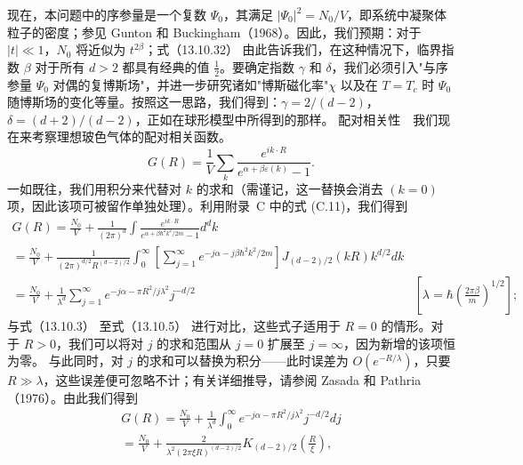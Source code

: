 现在，本问题中的序参量是一个复数 \(\Psi_{0}\)，其满足 \(|\Psi_{0}|^{2}=N_{0}/V\)，即系统中凝聚体粒子的密度；参见 Gunton 和 Buckingham（1968）。因此，我们预期：对于 \(|t|\ll1\)，\(N_{0}\) 将近似为 \(t^{2\beta}\)；式（13.10.32） 由此告诉我们，在这种情况下，临界指数 \(\beta\) 对于所有 \(d>2\) 都具有经典的值 \(\frac{1}{2}\)。要确定指数 \(\gamma\) 和 \(\delta\)，我们必须引入"与序参量 \(\Psi_{0}\) 对偶的复博斯场"，并进一步研究诸如"博斯磁化率"\(\chi\) 以及在 \(T=T_{c}\) 时 \(\Psi_{0}\) 随博斯场的变化等量。按照这一思路，我们得到：\(\gamma=2/(d-2)\)，\(\delta=(d+2)/(d-2)\)，正如在球形模型中所得到的那样。
配对相关性　我们现在来考察理想玻色气体的配对相关函数。
\begin{equation}\tag{13.6.41}\label{eq:13.6.41}
G ( R ) = \frac { 1 } { V } \sum _ { k } \frac { e ^{i k \cdot R} } { e ^{\alpha + \beta \varepsilon ( k )} - 1 } .
\end{equation}
一如既往，我们用积分来代替对 \(k\) 的求和（需谨记，这一替换会消去 \((k=0)\) 项，因此该项可被留作单独处理）。利用附录~C 中的式 (C.11)，我们得到
\begin{equation}\tag{13.6.42}\label{eq:13.6.42}
\begin{array}{rl} { G ( R ) = \frac { N _ { 0 } } { V } + \frac { 1 } { ( 2 \pi ) ^{d} } \int \frac { e ^{i k \cdot R} } { e ^{\alpha + \beta \hbar ^ { 2} k ^{2} / 2 m } - 1 } d ^{d} k } & { } \\{ = \frac { N _ { 0 } } { V } + \frac { 1 } { ( 2 \pi ) ^{d / 2} R ^{( d - 2 ) / 2} } \int _ { 0 } ^{\infty} \left[ \sum _ { j = 1 } ^{\infty} e ^{- j \alpha - j \beta \hbar ^ { 2} k ^{2} / 2 m } \right] J _ { ( d - 2 ) / 2 } ( k R ) k ^{d / 2} d k } & { } \\{ = \frac { N _ { 0 } } { V } + \frac { 1 } { \lambda ^{d} } \sum _ { j = 1 } ^{\infty} e ^{- j \alpha - \pi R ^ { 2} / j \lambda ^{2} } j ^{- d / 2} } & { \left[ \lambda = \hbar \left( \frac { 2 \pi \beta } { m } \right) ^{1 / 2} \right] ; } \end{array}
\end{equation}
与式（13.10.3） 至式（13.10.5） 进行对比，这些式子适用于 \(R=0\) 的情形。对于 \(R>0\)，我们可以将对 \(j\) 的求和范围从 \(j=0\) 扩展至 \(j=\infty\)，因为新增的该项恒为零。
与此同时，对 \(j\) 的求和可以替换为积分——此时误差为 \(O(e^{-R/\lambda})\)，只要 \(R \gg \lambda\)，这些误差便可忽略不计；有关详细推导，请参阅 Zasada 和 Pathria（1976）。由此我们得到
\begin{equation}\tag{13.6.43}\label{eq:13.6.43}
\begin{array}{r} { G ( R ) = \frac { N _ { 0 } } { V } + \frac { 1 } { \lambda ^{d} } \int _ { 0 } ^{\infty} e ^{- j \alpha - \pi R ^ { 2} / j \lambda ^{2} } j ^{- d / 2} d j } \\{ = \frac { N _ { 0 } } { V } + \frac { 2 } { \lambda ^{2} ( 2 \pi \xi R ) ^{( d - 2 ) / 2} } K _ { ( d - 2 ) / 2 } \left( \frac { R } { \xi } \right) , } \end{array}
\end{equation}
